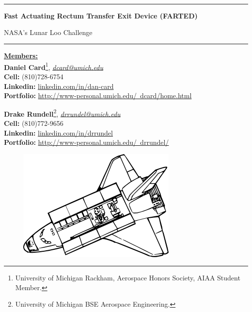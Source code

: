 \thispagestyle{empty}
    
\rule{\textwidth}{3pt}

\vspace{1cm}
\textbf{\LARGE{Fast Actuating Rectum Transfer Exit} Device (FARTED)}

\bigskip

NASA's Lunar Loo Challenge

\rule{\textwidth}{1pt}

\vspace{1cm}
\begin{flushleft}
    \underline{\textbf{\LARGE{Members:}}}\\
    \textbf{Daniel Card}\footnote{University of Michigan Rackham, Aerospace Honors Society, AIAA Student Member.}, \href{mailto:dcard@umich.edu}{\textit{dcard@umich.edu}}\\
    \textbf{Cell:} (810)728-6754\\
    \textbf{Linkedin:} \href{http://www.linkedin.com/in/dan-card}{linkedin.com/in/dan-card}\\
    \textbf{Portfolio:}  \href{http://www-personal.umich.edu/~dcard/home.html}{http://www-personal.umich.edu/~dcard/home.html}

    \bigskip
    \textbf{Drake Rundell}\footnote{University of Michigan BSE Aerospace Engineering.}, \href{mailto:drrundel}{\textit{drrundel@umich.edu}}\\
    \textbf{Cell:} (810)772-9656\\
    \textbf{Linkedin:} \href{http://www.linkedin.com/in/drrundel}{linkedin.com/in/drrundel}\\
    \textbf{Portfolio:}  \href{http://www-personal.umich.edu/~drrundel/}{http://www-personal.umich.edu/~drrundel/}
\end{flushleft}

\vspace{3cm}
\begin{figure}[h]
    \centering
    \includegraphics[width = 0.4\linewidth]{administrative/cover_page.png}
\end{figure}

\vfill
